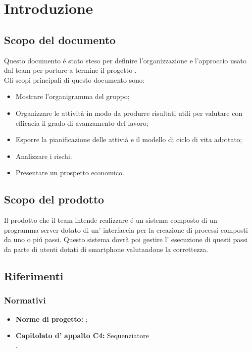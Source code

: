 \section{Introduzione}
\subsection{Scopo del documento}
Questo documento \'e stato steso per definire l'organizzazione e l'approccio usato dal team \gruppo per portare a termine il progetto \progetto. \\
Gli scopi principali di questo documento sono:
\begin{itemize}
  \item Mostrare l'organigramma del gruppo;
  \item Organizzare le attività in modo da produrre risultati utili per 
valutare con efficacia il grado di avanzamento del lavoro;
  \item	Esporre la pianificazione delle attivià e il modello di ciclo di vita adottato;
  \item Analizzare i rischi;
  \item Presentare un prospetto economico.
\end{itemize}

\subsection{Scopo del prodotto}
Il prodotto che il team \gruppo intende realizzare \'e un sistema composto di un programma server dotato di un' interfaccia per la creazione di processi composti da uno o pi\'u passi. Questo sistema dovrà poi gestire l' esecuzione di questi passi da parte di utenti dotati di smartphone valutandone la correttezza.\\

\subsection{Riferimenti}

\subsubsection{Normativi}
\begin{itemize}
	\item \textbf{Norme di progetto:} \infoNDP ;
	\item \textbf{Capitolato d' appalto C4:} Sequenziatore\\ \capitolato .
\end{itemize}
